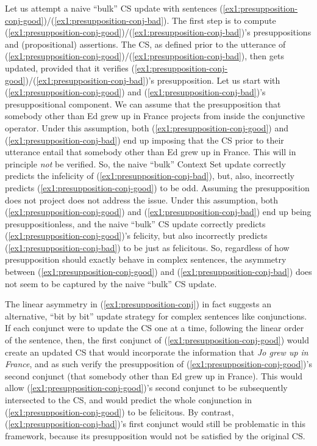 Let us attempt a naive ``bulk'' CS update with sentences (\ref{ex1:presupposition-conj-good})/(\ref{ex1:presupposition-conj-bad}). The first step is to compute (\ref{ex1:presupposition-conj-good})/(\ref{ex1:presupposition-conj-bad})'s presuppositions and (propositional) assertions. The CS, as defined prior to the utterance of (\ref{ex1:presupposition-conj-good})/(\ref{ex1:presupposition-conj-bad}), then gets updated, provided that it verifies (\ref{ex1:presupposition-conj-good})/(\ref{ex1:presupposition-conj-bad})'s presupposition. Let us start with (\ref{ex1:presupposition-conj-good}) and (\ref{ex1:presupposition-conj-bad})'s presuppositional component. We can assume that the presupposition that somebody other than Ed grew up in France projects from inside the conjunctive operator. Under this assumption, both (\ref{ex1:presupposition-conj-good}) and (\ref{ex1:presupposition-conj-bad}) end up imposing that the CS prior to their utterance entail that somebody other than Ed grew up in France. This will in principle \textit{not} be verified. So, the naive ``bulk'' Context Set update correctly predicts the infelicity of (\ref{ex1:presupposition-conj-bad}), but, also, incorrectly predicts (\ref{ex1:presupposition-conj-good}) to be odd. Assuming the presupposition does not project does not address the issue. Under this assumption, both (\ref{ex1:presupposition-conj-good}) and (\ref{ex1:presupposition-conj-bad}) end up being presuppositionless, and the naive ``bulk'' CS update correctly predicts (\ref{ex1:presupposition-conj-good})'s felicity, but also incorrectly predicts (\ref{ex1:presupposition-conj-bad}) to be just as felicitous. So, regardless of how presupposition should exactly behave in complex sentences, the asymmetry between (\ref{ex1:presupposition-conj-good}) and (\ref{ex1:presupposition-conj-bad}) does not seem to be captured by the naive ``bulk'' CS update. 

The linear asymmetry in (\ref{ex1:presupposition-conj}) in fact suggests an alternative, ``bit by bit'' update strategy for complex sentences like conjunctions. If each conjunct were to update the CS one at a time, following the linear order of the sentence, then, the first conjunct of (\ref{ex1:presupposition-conj-good}) would create an updated CS that would incorporate the information that \textit{Jo grew up in France}, and as such verify the presupposition of (\ref{ex1:presupposition-conj-good})'s second conjunct (that somebody other than Ed grew up in France). This would allow (\ref{ex1:presupposition-conj-good})'s second conjunct to be subsequently intersected to the CS, and would predict the whole conjunction in (\ref{ex1:presupposition-conj-good}) to be felicitous. By contrast, (\ref{ex1:presupposition-conj-bad})'s first conjunct would still be problematic in this framework, because its presupposition would not be satisfied by the original CS. 

